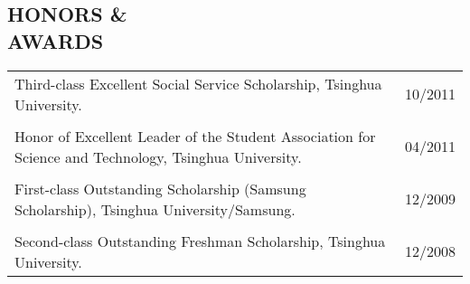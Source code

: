 \documentclass[margin]{res} %
\begin{document}
\begin{resume}
        \section{HONORS \& \\ AWARDS}
        \begin{tabular}{L{10cm}R{2.1cm}}
            Third-class Excellent Social Service Scholarship, Tsinghua
            University. & 10/2011 \\
            \vspace{2pt} \\%
            Honor of Excellent Leader of the Student Association for Science
            and Technology, Tsinghua University. & 04/2011 \\
            \vspace{2pt} \\%
            First-class Outstanding Scholarship (Samsung Scholarship),
            Tsinghua University/Samsung. & 12/2009 \\
            \vspace{2pt} \\%
            Second-class Outstanding Freshman Scholarship, Tsinghua University.
            & 12/2008
        \end{tabular}
        
    \end{resume}
\end{document}
